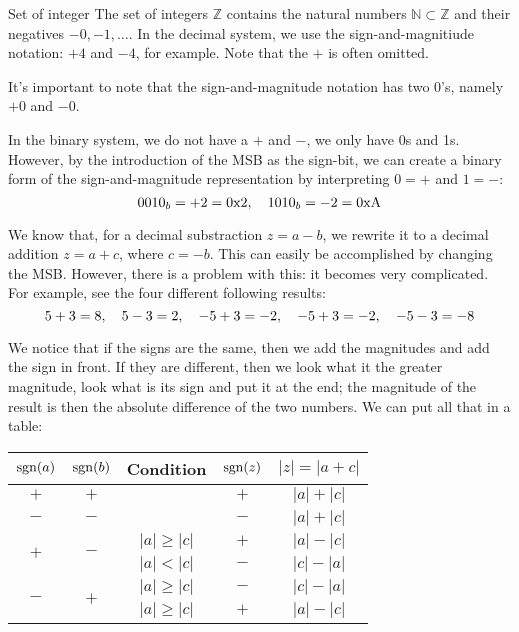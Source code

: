 \documentclass[a4paper]{article}
\begin{document}
\begin{parag}{Set of integer}
    The set of integers $\mathbb{Z}$ contains the natural numbers $\mathbb{N} \subset \mathbb{Z}$ and their negatives $-0, -1, \ldots$. In the decimal system, we use the sign-and-magnitiude notation: $+4$ and $-4$, for example. Note that the $+$ is often omitted.

    It's important to note that the sign-and-magnitude notation has two 0's, namely $+0$ and $-0$. 

    In the binary system, we do not have a $+$ and $-$, we only have 0s and 1s. However, by the introduction of the MSB as the sign-bit, we can create a binary form of the sign-and-magnitude representation by interpreting $0 = +$ and $1 = -$: 
    \[0010_b = +2 = \text{0x2}, \quad 1010_b = -2 = \text{0xA}\]
    
    We know that, for a decimal substraction $z = a - b$, we rewrite it to a decimal addition $z = a + c$, where $c = -b$. This can easily be accomplished by changing the MSB. However, there is a problem with this: it becomes very complicated. For example, see the four different following results: 
    \[5 + 3 = 8, \quad 5 - 3 = 2, \quad -5 + 3 = -2, \quad -5 + 3 = -2, \quad -5 - 3 = -8\]
    
    We notice that if the signs are the same, then we add the magnitudes and add the sign in front. If they are different, then we look what it the greater magnitude, look what is its sign and put it at the end; the magnitude of the result is then the absolute difference of the two numbers. We can put all that in a table:
    \begin{center}
    \begin{tabular}{|c|c||c||c|c|}
        \hline
        $\sgn\left(a\right)$ & $\sgn\left(b\right)$ & Condition & $\sgn\left(z\right)$ & $\left|z\right| = \left|a + c\right|$ \\
        \hline
        $+$ & $+$ &  & $+$ & $\left|a\right| + \left|c\right|$ \\
        \hline
        $-$ & $-$ &  & $-$ & $\left|a\right| + \left|c\right|$ \\
        \hline
        \multirow{2}{*}{$+$} & \multirow{2}{*}{$-$} & $\left|a\right|\geq \left|c\right|$ & $+$ & $\left|a\right| - \left|c\right|$ \\
        \hhline{|~|~||-||-|-|}
                             & & $\left|a\right| < \left|c\right|$ & $-$ & $\left|c\right| - \left|a\right|$ \\
        \hline
        \multirow{2}{*}{$-$} & \multirow{2}{*}{$+$} & $\left|a\right|\geq \left|c\right|$ & $-$ & $\left|c\right| - \left|a\right|$ \\
        \hhline{|~|~||-||-|-|}
                             & & $\left|a\right| \geq \left|c\right|$ & $+$ & $\left|a\right| - \left|c\right|$ \\
        \hline
    \end{tabular}
    \end{center}
    


\end{parag}
\end{document}
